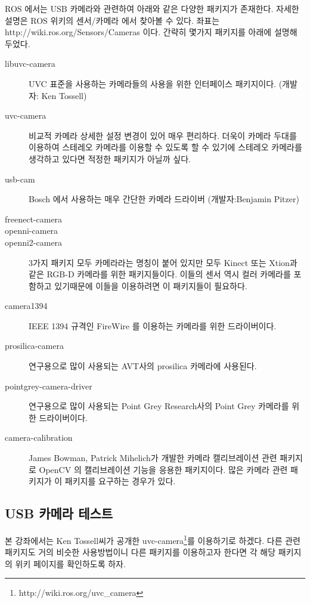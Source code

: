 ROS 에서는 USB 카메라와 관련하여 아래와 같은 다양한 패키지가 존재한다. 자세한 설명은 ROS 위키의 센서/카메라 에서 찾아볼 수 있다. 좌표는 http://wiki.ros.org/Sensors/Cameras 이다. 간략히 몇가지 패키지를 아래에 설명해 두었다.

\begin{description}
\item[libuvc-camera] UVC 표준을 사용하는 카메라들의 사용을 위한 인터페이스 패키지이다. (개발자: Ken Tossell)
\item[uvc-camera] 비교적 카메라 상세한 설정 변경이 있어 매우 편리하다. 더욱이 카메라 두대를 이용하여 스테레오 카메라를 이용할 수 있도록 할 수 있기에 스테레오 카메라를 생각하고 있다면 적정한 패키지가 아닐까 싶다.
\item[usb-cam] Bosch 에서 사용하는 매우 간단한 카메라 드라이버 (개발자:Benjamin Pitzer)
\item[freenect-camera]
\item[openni-camera]
\item[openni2-camera] 3가지 패키지 모두 카메라라는 명칭이 붙어 있지만 모두 Kinect 또는 Xtion과 같은 RGB-D 카메라를 위한 패키지들이다. 이들의 센서 역시 컬러 카메라를 포함하고 있기때문에 이들을 이용하려면 이 패키지들이 필요하다.
\item[camera1394] IEEE 1394 규격인 FireWire 를 이용하는 카메라를 위한 드라이버이다.
\item[prosilica-camera] 연구용으로 많이 사용되는 AVT사의 prosilica 카메라에 사용된다.
\item[pointgrey-camera-driver] 연구용으로 많이 사용되는 Point Grey Research사의 Point Grey 카메라를 위한 드라이버이다.
\item[camera-calibration] James Bowman, Patrick Mihelich가 개발한 카메라 캘리브레이션 관련 패키지로 OpenCV 의 캘리브레이션 기능을 응용한 패키지이다. 많은 카메라 관련 패키지가 이 패키지를 요구하는 경우가 있다.
\end{description}

\subsection{USB 카메라 테스트}

본 강좌에서는 Ken Tossell씨가 공개한 uvc-camera\footnote{http://wiki.ros.org/uvc\_camera}를 이용하기로 하겠다. 다른 관련 패키지도 거의 비슷한 사용방법이니 다른 패키지를 이용하고자 한다면 각 해당 패키지의 위키 페이지를 확인하도록 하자.

